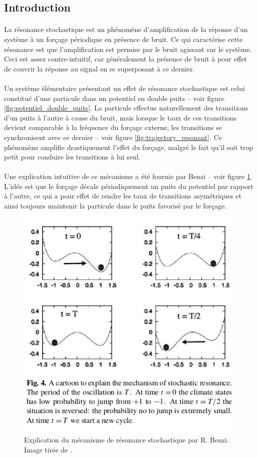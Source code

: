 \subsection{Introduction}

\paragraph{} La résonance stochastique est un phénomène d'amplification de la réponse d'un système à un forçage périodique en présence de bruit. Ce qui caractérise cette résonance est que l'amplification est permise par le bruit agissant sur le système. Ceci est assez contre-intuitif, car généralement la présence de bruit à pour effet de couvrir la réponse au signal en se superposant à ce dernier.

\paragraph{} Un système élémentaire présentant un effet de résonance stochastique est celui constitué d'une particule dans un potentiel en double puits \cite{scholarpedia} -- voir figure \ref{fig:potentiel_double_puits}. La particule effectue naturellement des transitions d'un puits à l'autre à cause du bruit, mais lorsque le taux de ces transitions devient comparable à la fréquence du forçage externe, les transitions se synchronisent avec ce dernier -- voir figure \ref{fig:trajectory_resonant}. Ce phénomène amplifie drastiquement l'effet du forçage, malgré le fait qu'il soit trop petit pour conduire les transitions à lui seul.

\paragraph{} Une explication intuitive de ce mécanisme a été fournie par Benzi \cite{benzi2010} -- voir figure \ref{fig:explication_mecanisme}. L'idée est que le forçage décale périodiquement un puits du potentiel par rapport à l'autre, ce qui a pour effet de rendre les taux de transitions asymétriques et ainsi toujours maintenir la particule dans le puits favorisé par le forçage. 

\begin{figure}[t]
	\centering
	\includegraphics[width=0.8\linewidth]{figures/mecanisme_benzi_2010}
	\caption{Explication du mécanisme de résonance stochastique par R. Benzi. Image tirée de \cite{benzi2010}.}
	\label{fig:explication_mecanisme}
\end{figure}
